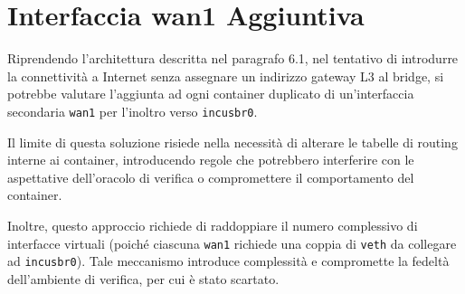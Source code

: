 \section{Interfaccia wan1 Aggiuntiva}\label{interfaccia-wan1-aggiuntiva}

Riprendendo l'architettura descritta nel paragrafo 6.1, nel tentativo di
introdurre la connettività a Internet senza assegnare un indirizzo
gateway L3 al bridge, si potrebbe valutare l'aggiunta ad ogni container
duplicato di un'interfaccia secondaria \passthrough{\lstinline!wan1!}
per l'inoltro verso \passthrough{\lstinline!incusbr0!}.

Il limite di questa soluzione risiede nella necessità di alterare le
tabelle di routing interne ai container, introducendo regole che
potrebbero interferire con le aspettative dell'oracolo di verifica o
compromettere il comportamento del container.

Inoltre, questo approccio richiede di raddoppiare il numero complessivo
di interfacce virtuali (poiché ciascuna \passthrough{\lstinline!wan1!}
richiede una coppia di \passthrough{\lstinline!veth!} da collegare ad
\passthrough{\lstinline!incusbr0!}). Tale meccanismo introduce
complessità e compromette la fedeltà dell'ambiente di verifica, per cui
è stato scartato.
